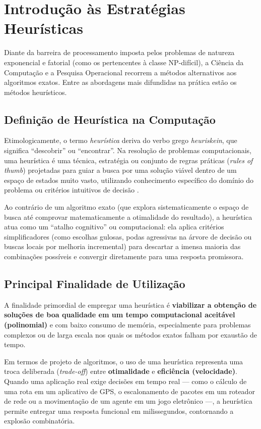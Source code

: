 \section{Introdução às Estratégias Heurísticas}

Diante da barreira de processamento imposta pelos problemas de natureza exponencial e fatorial (como os pertencentes à classe NP-difícil), a Ciência da Computação e a Pesquisa Operacional recorrem a métodos alternativos aos algoritmos exatos. Entre as abordagens mais difundidas na prática estão os métodos heurísticos.

\subsection{Definição de Heurística na Computação}

Etimologicamente, o termo \textit{heurística} deriva do verbo grego \textit{heuriskein}, que significa ``descobrir'' ou ``encontrar''. Na resolução de problemas computacionais, uma heurística é uma técnica, estratégia ou conjunto de regras práticas (\textit{rules of thumb}) projetadas para guiar a busca por uma solução viável dentro de um espaço de estados muito vasto, utilizando conhecimento específico do domínio do problema ou critérios intuitivos de decisão \cite{sciencedirect_heuristic, russell2013}.

Ao contrário de um algoritmo exato (que explora sistematicamente o espaço de busca até comprovar matematicamente a otimalidade do resultado), a heurística atua como um ``atalho cognitivo'' ou computacional: ela aplica critérios simplificadores (como escolhas gulosas, podas agressivas na árvore de decisão ou buscas locais por melhoria incremental) para descartar a imensa maioria das combinações possíveis e convergir diretamente para uma resposta promissora.

\subsection{Principal Finalidade de Utilização}

A finalidade primordial de empregar uma heurística é \textbf{viabilizar a obtenção de soluções de boa qualidade em um tempo computacional aceitável (polinomial)} e com baixo consumo de memória, especialmente para problemas complexos ou de larga escala nos quais os métodos exatos falham por exaustão de tempo.

Em termos de projeto de algoritmos, o uso de uma heurística representa uma troca deliberada (\textit{trade-off}) entre \textbf{otimalidade} e \textbf{eficiência (velocidade)}. Quando uma aplicação real exige decisões em tempo real --- como o cálculo de uma rota em um aplicativo de GPS, o escalonamento de pacotes em um roteador de rede ou a movimentação de um agente em um jogo eletrônico ---, a heurística permite entregar uma resposta funcional em milissegundos, contornando a explosão combinatória.

